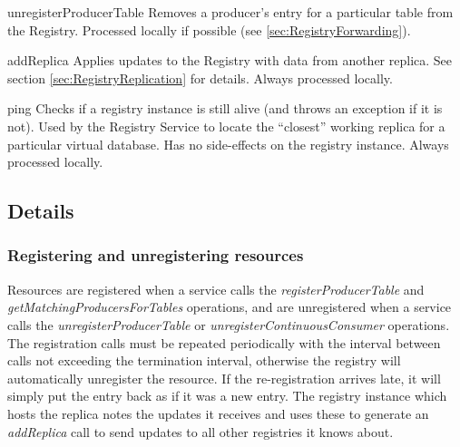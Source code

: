 \begin{method}{unregisterProducerTable}
\desc Removes a producer's entry for a particular table from the Registry.
Processed locally if possible (see \ref {sec:RegistryForwarding}).
\end{method}

\begin{method}{addReplica}
\desc Applies updates to the Registry with data from another replica. See section
\ref{sec:RegistryReplication} for details. Always processed locally.
\end{method}

\begin{method}[registry]{ping}
\OK
\desc
Checks if a registry instance is still alive (and throws an exception
if it is not). Used by the Registry Service to locate the ``closest''
working replica for a particular virtual database. Has no side-effects
on the registry instance.  Always processed locally.
\end{method}


\subsection{Details}
\subsubsection{Registering and unregistering resources}\label{sec:RegistryRegistering}

Resources are registered when a service calls the
\textit{registerProducerTable} and \textit{getMatchingProducersForTables}
operations, and are unregistered when a service calls the
\textit{unregisterProducerTable} or
\textit{unregisterContinuousConsumer} operations. The registration calls must
be repeated periodically with the interval between calls not exceeding the
termination interval, otherwise the registry will automatically unregister the
resource. If the re-registration arrives late, it will simply put the entry
back as if it was a new entry. The registry instance which hosts the replica
notes the updates it receives and uses these to generate an \textit{addReplica}
call to send updates to all other registries it knows about.

